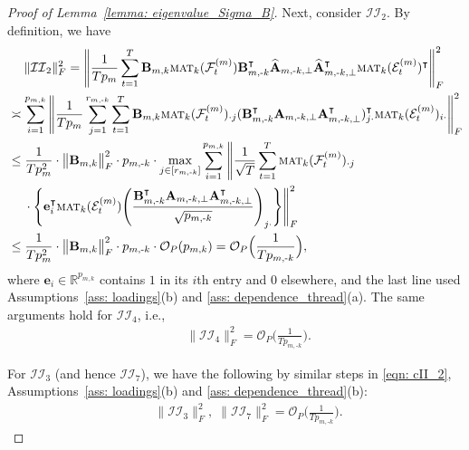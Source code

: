 \documentclass[aos]{imsart}
\theoremstyle{plain}
\theoremstyle{definition}
\def\mat{\textnormal{\textsc{mat}}}
\def\wh#1{\widehat{#1}}
\def\R{\mathbb{R}}
\def\cE{\mathcal{E}}
\def\cF{\mathcal{F}}
\def\cII{\mathcal{II}}
\def\cO{\mathcal{O}}
\def\be{\mathbf{e}}
\def\bA{\mathbf{A}}
\def\bB{\mathbf{B}}
\def\trans{\intercal}
\begin{document}
\begin{proof}[Proof of Lemma~\ref{lemma: eigenvalue_Sigma_B}]
Next, consider $\cII_2$. By definition, we have
\begin{align}
    &\;\quad
    \|\cII_2\|_F^2 = \Bigg\| \frac{1}{Tp_m} \sum_{t=1}^T \bB_{m,k} \mat_k(\cF_t^{(m)}) \bB_{m,\text{-}k}^\trans \wh{\bA}_{m,\text{-}k,\perp} \wh{\bA}_{m,\text{-}k,\perp}^\trans \mat_k(\cE_t^{(m)})^\trans \Bigg\|_F^2 \notag \\
    &\asymp
    \sum_{i=1}^{p_{m,k}} \Bigg\| \frac{1}{Tp_m} \sum_{j=1}^{r_{m,\text{-}k}} \sum_{t=1}^T \bB_{m,k} \mat_k(\cF_t^{(m)})_{\cdot j} (\bB_{m,\text{-}k}^\trans \bA_{m,\text{-}k,\perp} \bA_{m,\text{-}k,\perp}^\trans)_{j\cdot}^\trans \mat_k(\cE_t^{(m)})_{i\cdot} \Bigg\|_F^2 \notag \\
    &\leq
    \frac{1}{T p_m^2} \cdot \big\| \bB_{m,k} \big\|_F^2 \cdot p_{m,\text{-}k} \cdot \max_{j\in[r_{m,\text{-}k}]} \sum_{i=1}^{p_{m,k}} \Bigg\| \frac{1}{\sqrt{T}} \sum_{t=1}^T \mat_k(\cF_t^{(m)})_{\cdot j} \notag \\
    &\;\quad
    \cdot \Bigg\{ \be_i^\trans \mat_k(\cE_t^{(m)}) \Bigg( \frac{\bB_{m,\text{-}k}^\trans \bA_{m,\text{-}k,\perp} \bA_{m,\text{-}k,\perp}^\trans}{\sqrt{p_{m,\text{-}k}}} \Bigg)_{j\cdot} \Bigg\} \Bigg\|_F^2 \notag \\
    &\leq
    \frac{1}{T p_m^2} \cdot \big\| \bB_{m,k} \big\|_F^2 \cdot p_{m,\text{-}k} \cdot \cO_P(p_{m,k})
    = \cO_P\Big( \frac{1}{T p_{m,\text{-}k}} \Big) ,
    \label{eqn: cII_2}
\end{align}
where $\be_i \in\R^{p_{m,k}}$ contains $1$ in its $i$th entry and $0$ elsewhere, and the last line used Assumptions~\ref{ass: loadings}(b) and \ref{ass: dependence_thread}(a). The same arguments hold for $\cII_4$, i.e.,
\begin{align}
    &\;\quad
    \|\cII_4\|_F^2 = \cO_P\Big( \frac{1}{T p_{m,\text{-}k}} \Big) .
    \label{eqn: cII_4}
\end{align}

For $\cII_3$ (and hence $\cII_7$), we have the following by similar steps in \eqref{eqn: cII_2}, Assumptions~\ref{ass: loadings}(b) and \ref{ass: dependence_thread}(b):
\begin{align}
    &\;\quad
    \|\cII_3\|_F^2, \; \|\cII_7\|_F^2 = \cO_P\Big( \frac{1}{T p_{m,\text{-}k}} \Big) .
    \label{eqn: cII_3_7}
\end{align}



\end{proof}
\end{document}
